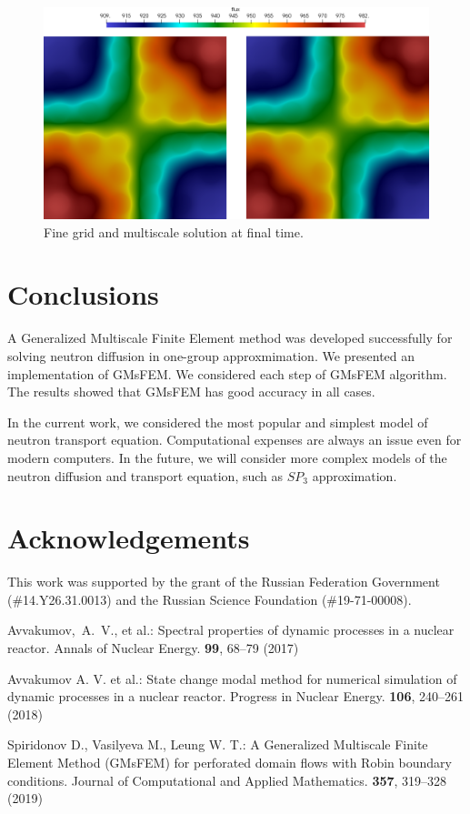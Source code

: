 \documentclass[runningheads]{llncs}
\begin{document}
\begin{figure}[h!]
\centering
\includegraphics[width=0.85\linewidth]{flux.png} 
\caption{Fine grid and multiscale solution at final time.}
\label{p6}
\end{figure} 

\section{Conclusions}
A Generalized Multiscale Finite Element method was developed successfully for solving neutron diffusion in one-group approxmimation.  
We presented an implementation of GMsFEM. 
We considered each step of GMsFEM algorithm.
The results showed that GMsFEM has good accuracy in all cases.

In the current work, we considered the most popular and simplest model of neutron transport equation.
Computational expenses are always an issue even for modern computers.
In the future, we will consider more complex models of the neutron diffusion and transport equation, such as $SP_3$ approximation. 

\section*{Acknowledgements}
This work was supported by the grant of the Russian Federation Government
(\#14.Y26.31.0013) and the Russian Science Foundation (\#19-71-00008).

\begin{thebibliography}{8}
Avvakumov,~A.~V., et al.: Spectral properties of dynamic processes in a nuclear reactor. Annals of Nuclear Energy. \textbf{99}, 68--79 (2017) 

Avvakumov A. V. et al.: State change modal method for numerical simulation of dynamic processes in a nuclear reactor. Progress in Nuclear Energy. \textbf{106}, 240--261 (2018)

Spiridonov D., Vasilyeva M., Leung W. T.: A Generalized Multiscale Finite Element Method (GMsFEM) for perforated domain flows with Robin boundary conditions. Journal of Computational and Applied Mathematics. \textbf{357}, 319--328 (2019)

\end{thebibliography}
\end{document}
